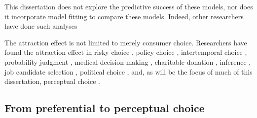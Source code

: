 \documentclass{umassthesis}          %
\begin{document}
This dissertation does not explore the predictive success of these models, nor does it incorporate model fitting to compare these models. Indeed, other researchers have done such analyses \parencite{turnerCompetingTheoriesMultialternative2018a,cataldoModelingPreferenceReversals2021,evansResponsetimeDataProvide2019b,molloyWhatResponseTime2019a,berkowitschRigorouslyTestingMultialternative2014b}

The attraction effect is not limited to merely consumer choice. Researchers have found the attraction effect in risky choice \parencite{mohr2017attraction}, policy choice \parencite{herneDecoyAlternativesPolicy1997b}, intertemporal choice \parencite{mariniAttractionComesMany2020}, probability judgment \parencite{caiWhenAlternativeHypotheses2023}, medical decision-making \parencite{schwartz1999more}, charitable donation \parencite{pittarello2020three},  inference \parencite{truebloodMultialternativeContextEffects2012}, job candidate selection \parencite{highhouseContextDependentSelectionEffects1996}, political choice \parencite{pan1995attractiovoting}, and, as will be the focus of much of this dissertation, perceptual choice \parencite{evansImpactPresentationOrder2021,trueblood2013not,spektorRepulsionEffectPreferential2022,spektorWhenGoodLooks2018b,yearsleyContextEffectsSimilarity2022,turnerCompetingTheoriesMultialternative2018a,liaoInfluenceDistanceDecoy2021}. 

\subsection{From preferential to perceptual choice}
\end{document}
